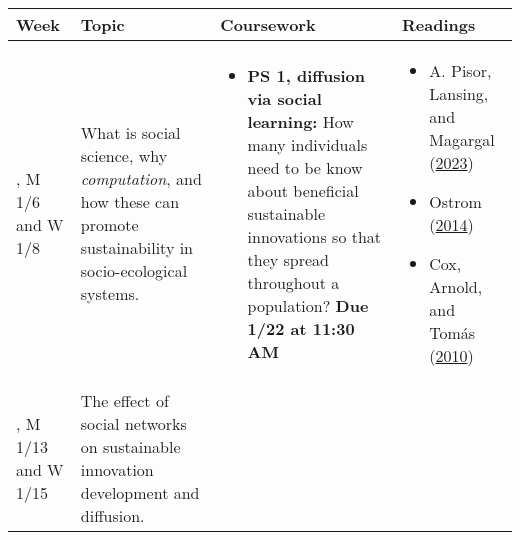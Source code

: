\documentclass[letterpaper]{article}
\providecommand{\tightlist}{%
  \setlength{\itemsep}{0pt}\setlength{\parskip}{0pt}}
\begin{document}
\begin{longtable}[]{@{}
  >{\raggedright\arraybackslash}p{}
  >{\raggedright\arraybackslash}p{}
  >{\raggedright\arraybackslash}p{}
  >{\raggedright\arraybackslash}p{}@{}}
\toprule\noalign{}
\begin{minipage}[b]{\linewidth}\raggedright
Week
\end{minipage} & \begin{minipage}[b]{\linewidth}\raggedright
Topic
\end{minipage} & \begin{minipage}[b]{\linewidth}\raggedright
Coursework
\end{minipage} & \begin{minipage}[b]{\linewidth}\raggedright
Readings
\end{minipage} \\
\midrule\noalign{}
\endhead
\bottomrule\noalign{}
\endlastfoot
1, M 1/6 and W 1/8 & What is social science, why \emph{computation}, and
how these can promote sustainability in socio-ecological systems. &
\begin{minipage}[t]{\linewidth}\raggedright
\begin{itemize}
\tightlist
\item
  \textbf{PS 1, diffusion via social learning:} How many individuals
  need to be know about beneficial sustainable innovations so that they
  spread throughout a population? \textbf{Due 1/22 at 11:30 AM}
\end{itemize}
\end{minipage} & \begin{minipage}[t]{\linewidth}\raggedright
\begin{itemize}
\tightlist
\item
  {A. Pisor, Lansing, and Magargal
  (\hyperref[ref-PisorLansingMagargal2023]{2023})}
\item
  {Ostrom (\hyperref[ref-Ostrom2014]{2014})}
\item
  {Cox, Arnold, and Tomás (\hyperref[ref-Cox2010]{2010})}
\end{itemize}
\end{minipage} \\
2, M 1/13 and W 1/15 & The effect of social networks on sustainable
innovation development and diffusion. & &
\begin{minipage}[t]{\linewidth}\raggedright
\begin{itemize}

\end{itemize}
\end{minipage}
\end{longtable}
\end{document}
